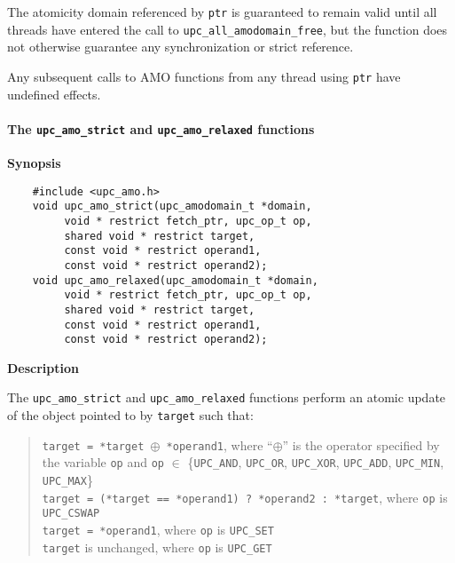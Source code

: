 \np The atomicity domain referenced by {\tt ptr} is guaranteed to remain valid
    until all threads have entered the call to {\tt upc\_all\_amodomain\_free},
    but the function does not otherwise guarantee any synchronization or
    strict reference.

\np Any subsequent calls to AMO functions from any thread using {\tt ptr} have
    undefined effects.

\paragraph{The {\tt upc\_amo\_strict} and {\tt upc\_amo\_relaxed} functions}

{\bf Synopsis}

\npf\vspace{-1.8em}
\begin{verbatim}
    #include <upc_amo.h>
    void upc_amo_strict(upc_amodomain_t *domain,
         void * restrict fetch_ptr, upc_op_t op,
         shared void * restrict target,
         const void * restrict operand1,
         const void * restrict operand2);
    void upc_amo_relaxed(upc_amodomain_t *domain,
         void * restrict fetch_ptr, upc_op_t op,
         shared void * restrict target,
         const void * restrict operand1,
         const void * restrict operand2);
\end{verbatim}

{\bf Description}

\np The {\tt upc\_amo\_strict} and {\tt upc\_amo\_relaxed} functions perform
    an atomic update of the object pointed to by {\tt target} such that:

    \begin{verse}
      {\tt *target = *target $\oplus$ *operand1},
        where ``$\oplus$'' is the operator specified by the variable {\tt op}
        and {\tt op} $\in$ \{{\tt UPC\_AND}, {\tt UPC\_OR}, {\tt UPC\_XOR},
        {\tt UPC\_ADD}, {\tt UPC\_MIN}, {\tt UPC\_MAX}\} \\
      {\tt *target = (*target == *operand1) ? *operand2 : *target},
        where {\tt op} is {\tt UPC\_CSWAP} \\
      {\tt *target = *operand1},
        where {\tt op} is {\tt UPC\_SET} \\
      {\tt *target} is unchanged,
        where {\tt op} is {\tt UPC\_GET} \\
    \end{verse}

